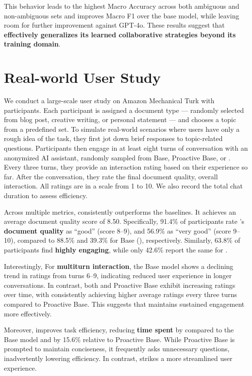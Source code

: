 This behavior leads to the highest Macro Accuracy across both ambiguous and non-ambiguous sets and improves Macro F1 over the base model, while leaving room for further improvement against GPT-4o. These results suggest that \textbf{\name{} effectively generalizes its learned collaborative strategies beyond its training domain}.

\section{Real-world User Study }
 We conduct a large-scale user study on Amazon Mechanical Turk with \numturker{} participants. Each participant is assigned a document type — randomly selected from blog post, creative writing, or personal statement — and chooses a topic from a predefined set. To simulate real-world scenarios where users have only a rough idea of the task, they first jot down brief responses to topic-related questions.
Participants then engage in at least eight turns of conversation with an anonymized AI assistant, randomly sampled from Base, Proactive Base, or \name{}. Every three turns, they provide an interaction rating based on their experience so far. After the conversation, they rate the final document quality, overall interaction. All ratings are in a scale from 1 to 10. We also record the total chat duration to assess efficiency.

 Across multiple metrics, \name{} consistently outperforms the baselines. It achieves an average document quality score of 8.50. Specifically, 91.4\% of participants rate \name{}'s \textbf{document quality} as ``good'' (score 8–9), and 56.9\% as ``very good'' (score 9–10), compared to 88.5\% and 39.3\% for Base (\llama{}), respectively. Similarly, 63.8\% of participants find \name{} \textbf{highly engaging}, while only 42.6\% report the same for \llama{}. 

Interestingly, For \textbf{multiturn interaction}, the Base model shows a declining trend in ratings from turns 6–9, indicating reduced user experience in longer conversations. In contrast, both \name{} and Proactive Base exhibit increasing ratings over time, with \name{} consistently achieving higher average ratings every three turns compared to Proactive Base. This suggests that \name{} maintains sustained engagement more effectively.  

Moreover, \name{} improves task efficiency, reducing \textbf{time spent} by \realtimeimprov{} compared to the Base model and by 15.6\% relative to Proactive Base. While Proactive Base is prompted to maintain conciseness, it frequently asks unnecessary questions, inadvertently lowering efficiency. In contrast, \name{} strikes a more streamlined user experience.

